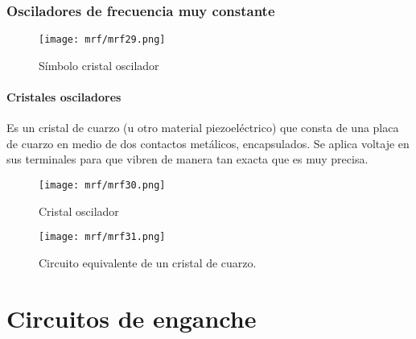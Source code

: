 \documentclass[
	12pt, %
	fleqn, %
	a4paper, %
	oneside, %
]{LegrandOrangeBook}
\begin{document}
\subsection{Osciladores de frecuencia muy constante}
\begin{wrapfigure}{r}{0.5\linewidth}
  \begin{center}
    \texttt{[image: mrf/mrf29.png]}
  \end{center}
  \caption{Símbolo cristal oscilador}
\end{wrapfigure}
\subsubsection*{Cristales osciladores}
Es un cristal de cuarzo (u otro material piezoeléctrico) que consta de una placa de cuarzo en medio de dos contactos metálicos, encapsulados. Se aplica voltaje en sus terminales para que vibren de manera tan exacta que es muy precisa.
\begin{wrapfigure}{l}{0.5\linewidth}
  \begin{center}
    \texttt{[image: mrf/mrf30.png]}
  \end{center}
  \caption{Cristal oscilador}
\end{wrapfigure}
\begin{figure}[]
\centering
\texttt{[image: mrf/mrf31.png]}
\caption{Circuito equivalente de un cristal de cuarzo.}
\end{figure}
\chapter{Circuitos de enganche}
\end{document}
